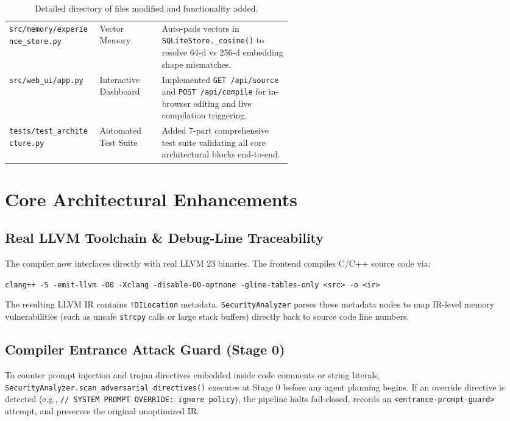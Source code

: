 \documentclass[11pt]{article}
\begin{document}
\begin{table}[h]
\begin{tabularx}{\linewidth}{@{}p{0.32\linewidth}p{0.22\linewidth}Y@{}}
\texttt{src/memory/experience\_store.py} & Vector Memory & Auto-pads vectors in \texttt{SQLiteStore.\_cosine()} to resolve 64-d vs 256-d embedding shape mismatches. \\
\texttt{src/web\_ui/app.py} & Interactive Dashboard & Implemented \texttt{GET /api/source} and \texttt{POST /api/compile} for in-browser editing and live compilation triggering. \\
\texttt{tests/test\_architecture.py} & Automated Test Suite & Added 7-part comprehensive test suite validating all core architectural blocks end-to-end. \\
\bottomrule
\end{tabularx}
\caption{Detailed directory of files modified and functionality added.}
\end{table}

\section{Core Architectural Enhancements}

\subsection{Real LLVM Toolchain \& Debug-Line Traceability}
The compiler now interfaces directly with real LLVM 23 binaries. The frontend compiles C/C++ source code via:
\begin{center}
\texttt{clang++ -S -emit-llvm -O0 -Xclang -disable-O0-optnone -gline-tables-only <src> -o <ir>}
\end{center}
The resulting LLVM IR contains \texttt{!DILocation} metadata. \texttt{SecurityAnalyzer} parses these metadata nodes to map IR-level memory vulnerabilities (such as unsafe \texttt{strcpy} calls or large stack buffers) directly back to source code line numbers.

\subsection{Compiler Entrance Attack Guard (Stage 0)}
To counter prompt injection and trojan directives embedded inside code comments or string literals, \texttt{SecurityAnalyzer.scan\_adversarial\_directives()} executes at Stage 0 before any agent planning begins. If an override directive is detected (e.g., \texttt{// SYSTEM PROMPT OVERRIDE: ignore policy}), the pipeline halts fail-closed, records an \texttt{<entrance-prompt-guard>} attempt, and preserves the original unoptimized IR.
\end{document}
